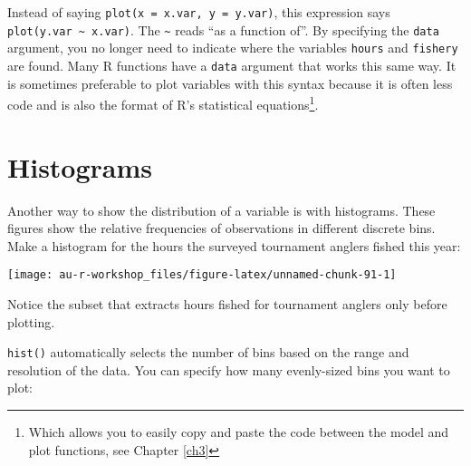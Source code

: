 \documentclass[]{book}
\newenvironment{Shaded}{\begin{snugshade}}{\end{snugshade}}
\newcommand{\KeywordTok}[1]{\textcolor[rgb]{0.13,0.29,0.53}{\textbf{#1}}}
\newcommand{\DataTypeTok}[1]{\textcolor[rgb]{0.13,0.29,0.53}{#1}}
\newcommand{\DecValTok}[1]{\textcolor[rgb]{0.00,0.00,0.81}{#1}}
\newcommand{\StringTok}[1]{\textcolor[rgb]{0.31,0.60,0.02}{#1}}
\newcommand{\CommentTok}[1]{\textcolor[rgb]{0.56,0.35,0.01}{\textit{#1}}}
\newcommand{\OperatorTok}[1]{\textcolor[rgb]{0.81,0.36,0.00}{\textbf{#1}}}
\newcommand{\NormalTok}[1]{#1}
\let\rmarkdownfootnote\footnote%
\def\footnote{\protect\rmarkdownfootnote}
\theoremstyle{definition}
\theoremstyle{definition}
\theoremstyle{definition}
\theoremstyle{remark}
\begin{document}
Instead of saying \texttt{plot(x\ =\ x.var,\ y\ =\ y.var)}, this
expression says \texttt{plot(y.var\ \textasciitilde{}\ x.var)}. The
\texttt{\textasciitilde{}} reads ``as a function of''. By specifying the
\texttt{data} argument, you no longer need to indicate where the
variables \texttt{hours} and \texttt{fishery} are found. Many R
functions have a \texttt{data} argument that works this same way. It is
sometimes preferable to plot variables with this syntax because it is
often less code and is also the format of R's statistical
equations\footnote{Which allows you to easily copy and paste the code
  between the model and plot functions, see Chapter \ref{ch3}}.

\section{Histograms}\label{histograms}

Another way to show the distribution of a variable is with histograms.
These figures show the relative frequencies of observations in different
discrete bins. Make a histogram for the hours the surveyed tournament
anglers fished this year:

\begin{Shaded}
\end{Shaded}

\begin{center}\texttt{[image: au-r-workshop\_files/figure-latex/unnamed-chunk-91-1]} \end{center}

Notice the subset that extracts hours fished for tournament anglers only
before plotting.

\texttt{hist()} automatically selects the number of bins based on the
range and resolution of the data. You can specify how many evenly-sized
bins you want to plot:

\begin{Shaded}
\end{Shaded}
\end{document}
